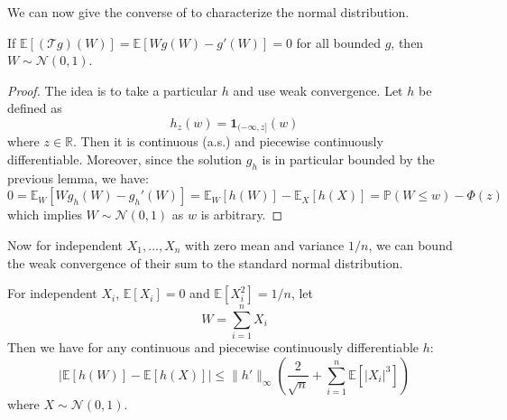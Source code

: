 \documentclass{article}
\begin{document}
We can now give the converse of  to characterize the normal distribution.  

\begin{theorem}
    If $\mathbb{E}[(\mathcal{T}g)(W)]=\mathbb{E}[Wg(W) - g'(W)] = 0$ for all bounded $g$, then $W\sim \mathcal{N}(0,1)$.
\end{theorem}

\begin{proof}
    The idea is to take a particular $h$ and use weak convergence. Let $h$ be defined as 
    \begin{equation*}
        h_z(w) = \mathbf{1}_{(-\infty, z]}(w)
    \end{equation*}
    where $z\in \mathbb{R}$. Then it is continuous (a.s.) and piecewise continuously differentiable. Moreover, since the solution $g_h$ is in particular bounded by the previous lemma, we have:  
    \begin{equation*}
        0 = \mathbb{E}_W[Wg_h(W)-g_h'(W)] = \mathbb{E}_W[h(W)] - \mathbb{E}_X[h(X)]=\mathbb{P}(W\leq w) - \Phi(z)
    \end{equation*}
    which implies $W\sim \mathcal{N}(0,1)$ as $w$ is arbitrary.
\end{proof}

Now for independent $X_1, \ldots, X_n$ with zero mean and variance $1/n$, we can bound the weak convergence of their sum to the standard normal distribution.  

\begin{theorem}
    For independent $X_i$, $\mathbb{E}[X_i]=0$ and $\mathbb{E}[X_i^2]=1/n$, let
    $$
    W = \sum_{i=1}^{n} X_i
    $$ 
    Then we have for any continuous and piecewise continuously differentiable $h$:
    \begin{equation*}
        \left|\mathbb{E}[h(W)] - \mathbb{E}[h(X)]\right| \leq \|h'\|_\infty \left( \frac{2}{\sqrt{n}} + \sum_{i=1}^{n} \mathbb{E}[|X_i|^3]\right)
    \end{equation*}
    where $X\sim \mathcal{N}(0,1)$.
\end{theorem}
\end{document}
